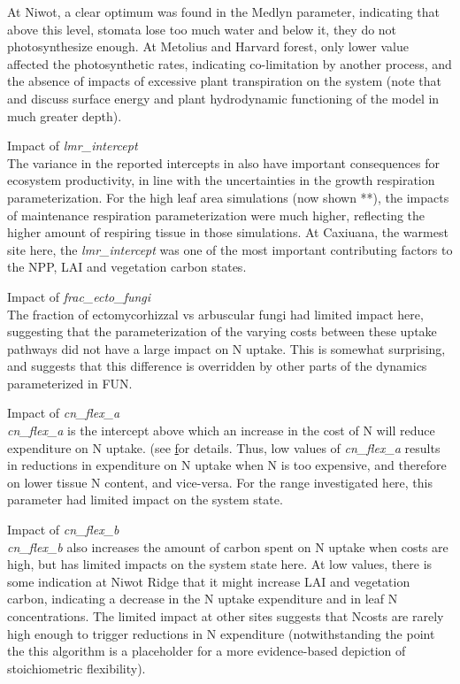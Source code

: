 \documentclass[draft,linenumbers]{agujournal}
\begin{document}
At Niwot, a clear optimum was found in the Medlyn parameter, indicating that above this level, stomata lose too much water and below it, they do not photosynthesize enough. At Metolius and Harvard forest, only lower value affected the photosynthetic rates, indicating co-limitation by another process, and the absence of impacts of excessive plant transpiration on the system (note that \cite{kennedy} and \cite{dagon} discuss surface energy and plant hydrodynamic functioning of the model in much greater depth). 

Impact of \emph{lmr\_intercept}\\
The variance in the reported intercepts in \cite{atkin2016} also have important consequences for ecosystem productivity, in line with the uncertainties in the growth respiration parameterization. For the high leaf area simulations (now shown **), the impacts of maintenance respiration parameterization were much higher, reflecting the higher amount of respiring tissue in those simulations. At Caxiuana, the warmest site here, the \emph{lmr\_intercept} was one of the most important contributing factors to the NPP, LAI and vegetation carbon states.  

Impact of \emph{frac\_ecto\_fungi}\\
The fraction of ectomycorhizzal vs arbuscular fungi had limited impact here, suggesting that the parameterization of the varying costs between these uptake pathways did not have a large impact on N uptake. This is somewhat surprising, and suggests that this difference is overridden by other parts of the dynamics parameterized in FUN.

Impact of \emph{cn\_flex\_a}\\
\emph{cn\_flex\_a}  is the intercept above which an increase in the cost of N will reduce expenditure on N uptake.  (see \href{https://escomp.github.io/ctsm-docs/doc/build/html/tech_note/FUN/CLM50_Tech_Note_FUN.html#modifications-to-allow-variation-in-c-n-ratios} for details. Thus, low values of \emph{cn\_flex\_a}  results in reductions in expenditure on N uptake when N is too expensive, and therefore on lower tissue N content, and vice-versa.   For the range investigated here, this parameter had limited impact on the system state. 


Impact of \emph{cn\_flex\_b}\\
\emph{cn\_flex\_b} also increases the amount of carbon spent on N uptake when costs are high, but has limited impacts on the system state here. At low values, there is some indication at Niwot Ridge that it might increase LAI and vegetation carbon, indicating a decrease in the N uptake expenditure and in leaf N concentrations.  The limited impact at other sites suggests that Ncosts are rarely high enough to trigger reductions in N expenditure (notwithstanding the point the this algorithm is a placeholder for a more evidence-based depiction of stoichiometric flexibility). 
\end{document}
